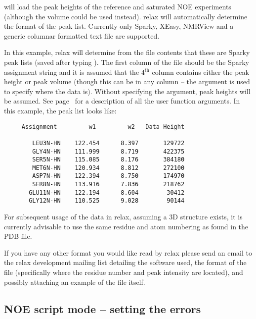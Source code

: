 will load the peak heights of the reference and saturated NOE experiments (although the volume could be used instead).  relax will automatically determine the format of the peak list.  Currently only Sparky, XEasy, NMRView and a generic columnar formatted text file are supported.

In this example, relax will determine from the file contents that these are Sparky peak lists (saved after typing ).  The first column of the file should be the Sparky assignment string and it is assumed that the 4$^\textrm{th}$ column contains either the peak height or peak volume (though this can be in any column -- the  argument is used to specify where the data is).  Without specifying the  argument, peak heights will be assumed.  See page~\pageref{uf: spectrum.read_intensities} for a description of all the  user function arguments.  In this example, the peak list looks like:

{\footnotesize \begin{verbatim}
     Assignment         w1         w2   Data Height

        LEU3N-HN    122.454      8.397       129722
        GLY4N-HN    111.999      8.719       422375
        SER5N-HN    115.085      8.176       384180
        MET6N-HN    120.934      8.812       272100
        ASP7N-HN    122.394      8.750       174970
        SER8N-HN    113.916      7.836       218762
       GLU11N-HN    122.194      8.604        30412
       GLY12N-HN    110.525      9.028        90144
\end{verbatim}}

For subsequent usage of the data in relax, assuming a 3D structure exists, it is currently advisable to use the same residue and atom numbering as found in the PDB file.

If you have any other format you would like read by relax please send an email to the relax development mailing list detailing the software used, the format of the file (specifically where the residue number and peak intensity are located), and possibly attaching an example of the file itself.




\subsection{NOE script mode -- setting the errors}

